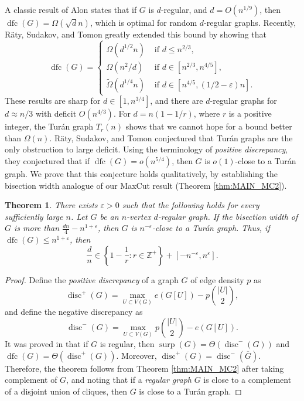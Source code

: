 \documentclass[11pt]{article}
\theoremstyle{plain}
\newtheorem{theorem}{Theorem}[section]
\theoremstyle{definition}
\DeclareMathOperator{\disc}{disc}
\DeclareMathOperator{\surp}{surp}
\DeclareMathOperator{\dfc}{dfc}
\newcommand{\eps}{\varepsilon}
\begin{document}
A classic result of Alon \cite{Alon93} states that if $G$ is $d$-regular, and $d=O(n^{1/9})$, then  $\dfc(G)=\Omega(\sqrt{d}n)$, which is optimal for random $d$-regular graphs. 
Recently, R\"aty, Sudakov, and Tomon \cite{RST} greatly extended this bound by showing that 
$$\dfc(G)=\begin{cases}\Omega(d^{1/2}n) &\mbox{ if } d\leq n^{2/3},\\
                        \Omega(n^2/d) &\mbox{ if } d\in [n^{2/3},n^{4/5}],\\
                        \widetilde{\Omega}(d^{1/4}n) &\mbox{ if } d\in [n^{4/5},(1/2-\eps)n].
            \end{cases}$$
These results are sharp for $d\in [1,n^{3/4}]$, and there are $d$-regular graphs for $d\approx n/3$ with deficit $O(n^{4/3})$. For $d=n(1-1/r)$, where $r$ is a positive integer, the Tur\'an graph $T_r(n)$ shows that we cannot hope for a bound better than $\Omega(n)$. R\"aty, Sudakov, and Tomon \cite{RST} conjectured that Tur\'an graphs are the only obstruction to large deficit. Using the terminology of \emph{positive discrepancy}, they conjectured that if $\dfc(G)=o(n^{5/4})$, then $G$ is $o(1)$-close to a Tur\'an graph. We prove that this conjecture holds qualitatively, by establishing the bisection width analogue of our MaxCut result (Theorem \ref{thm:MAIN_MC2}).

\begin{theorem}\label{thm:MAIN_BW1}
There exists $\eps>0$ such that the following holds for every sufficiently large $n$. Let $G$ be an $n$-vertex $d$-regular graph.
If the bisection width of $G$ is more than $\frac{dn}{4}-n^{1+\eps}$, then $G$ is $n^{-\eps}$-close to a Tur\'an graph. Thus, if $\dfc(G)\leq n^{1+\eps}$, then
$$\frac{d}{n}\in \left\{1-\frac{1}{r}:r\in \mathbb{Z}^+\right\}+[-n^{-\eps},n^{\eps}].$$ 
\end{theorem}

\begin{proof}
    Define the \emph{positive discrepancy} of a graph $G$ of edge density $p$ as 
    $$\disc^{+}(G)=\max_{U\subset V(G)} e(G[U])-p\binom{|U|}{2},$$
    and define the negative discrepancy as 
    $$\disc^{-}(G)=\max_{U\subset V(G)} p\binom{|U|}{2}-e(G[U]).$$
    It was proved in \cite[Lemma 2.6]{RST} that if $G$ is regular, then $\surp(G)=\Theta(\disc^{-}(G))$ and $\dfc(G)=\Theta(\disc^{+}(G))$. Moreover, $\disc^{+}(G)=\disc^{-}(\overline{G})$. 
    Therefore, the theorem follows from Theorem \ref{thm:MAIN_MC2} after taking complement of $G$, and noting that if a \emph{regular graph} $G$ is close to a complement of a disjoint union of cliques, then $G$ is close to a Tur\'an graph.
\end{proof}
\end{document}
